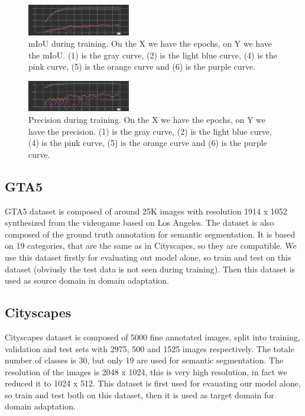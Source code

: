 \documentclass[conference]{IEEEtran}
\begin{document}
\begin{figure}[tp]
\centerline{\includegraphics[width=0.4\textwidth]{figures/miou.png}}
\caption{mIoU during training. On the X we have the epochs, on Y we have the mIoU. (1) is the gray curve, (2) is the light blue
curve, (4) is the pink curve, (5) is the orange curve and (6) is the purple curve.}
\label{miou}
\end{figure}

\begin{figure}[tp]
\centerline{\includegraphics[width=0.4\textwidth]{figures/precision.png}}
\caption{Precision during training. On the X we have the epochs, on Y we have the precision. (1) is the gray curve, (2) is the light blue
curve, (4) is the pink curve, (5) is the orange curve and (6) is the purple curve.}
\label{precision}
\end{figure}

\subsection{GTA5}
GTA5 dataset \cite{b4} is composed of around 25K images with resolution 1914 x 1052 synthesized from the videogame based on Los Angeles.
The dataset is also composed of the ground truth annotation for semantic segmentation. It is based on 19 categories, that are the same
as in Cityscapes, so they are compatible. We use this dataset firstly for evaluating out model alone, so train and test on this dataset
(obviusly the test data is not seen during training). Then this dataset is used as source domain in domain adaptation.
\subsection{Cityscapes}
Cityscapes dataset \cite{b5} is composed of 5000 fine annotated images, split into training, validation and test sets with 2975, 500
and 1525 images respectively. The totale number of classes is 30, but only 19 are used for semantic segmentation. The resolution of the
images is 2048 x 1024, this is very high resolution, in fact we reduced it to 1024 x 512. This dataset is first used for evauating our
model alone, so train and test both on this dataset, then it is used as target domain for domain adaptation. 
\end{document}

